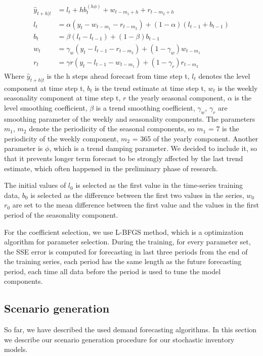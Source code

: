 \documentclass[11pt,a4paper]{article}
\begin{document}
\begin{equation}
\begin{gathered}
\begin{aligned}
\hat{y}_{t+h|t} &= l_t + h b_t^{(h\phi)} + w_{t-m_1 + h} + r_{t-m_2 +h} \\
l_t &= \alpha (y_t - w_{t-m_1} - r_{t-m_2}) + (1-\alpha)(l_{t-1} + b_{t-1}) \\
b_t &= \beta(l_t - l_{t-1}) + (1-\beta) b_{t-1} \\
w_t &= \gamma_{w}(y_t - l_{t-1} - r_{t-m_2}) + (1-\gamma_{w}) w_{t-m_1} \\
r_t &= \gamma{r}(y_t - l_{t-1} - w_{t-m_1}) + (1-\gamma_{r}) r_{t-m_2}
\end{aligned}
\end{gathered}
\end{equation}
Where $\hat{y}_{t+h|t}$ is the h steps ahead forecast from time step t,
$l_t$ denotes the level component at time step t, $b_t$ is the trend estimate at time step t, $w_t$ is the weekly seasonality component at time step t, $r$ the yearly seasonal component, $\alpha$ is the level smoothing coefficient, $\beta$ is a trend smoothing coefficient, $\gamma_w$, $\gamma_r$ are smoothing parameter of the weekly and seasonality components. The parameters $m_1$, $m_2$ denote the periodicity of the seasonal components, so $m_1$ = 7 is the periodicity of the weekly component, $m_2$ = 365 of the yearly component. Another parameter is $\phi$, which is a trend damping parameter. We decided to include it, so that it prevents longer term forecast to be strongly affected by the last trend estimate, which often happened in the preliminary phase of research. 

The initial values of $l_0$ is selected as the first value in the time-series training data, $b_0$ is selected as the difference between the first two values in the series, $w_0$  $r_0$ are set to the mean difference between the first value and the values in the first period of the seasonality component.

For the coefficient selection, we use L-BFGS \cite{bfgs} method, which is a optimization algorithm for parameter selection. During the training, for every parameter set, the SSE error is computed for forecasting in last three periods from the end of the training series, each period has the same length as the future forecasting period, each time all data before the period is used to tune the model components.


\subsection{Scenario generation}
\label{sec:approach_scenario}
So far, we have described the used demand forecasting algorithms. In this section we describe our scenario generation procedure for our stochastic inventory models.
\end{document}
